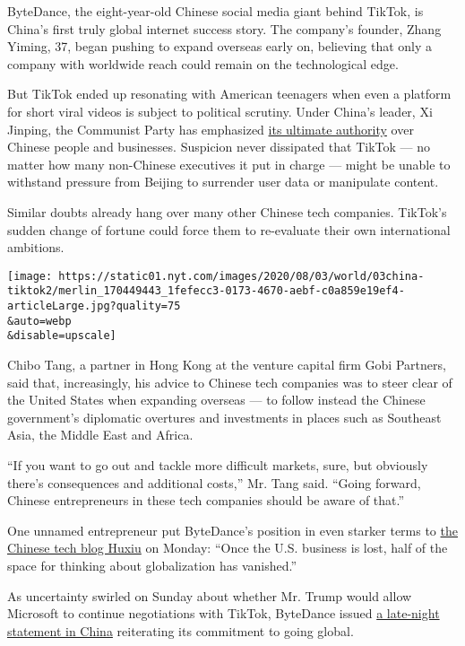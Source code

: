 ByteDance, the eight-year-old Chinese social media giant behind TikTok,
is China's first truly global internet success story. The company's
founder, Zhang Yiming, 37, began pushing to expand overseas early on,
believing that only a company with worldwide reach could remain on the
technological edge.

But TikTok ended up resonating with American teenagers when even a
platform for short viral videos is subject to political scrutiny. Under
China's leader, Xi Jinping, the Communist Party has emphasized
\href{https://www.nytimes.com/2018/12/18/world/asia/xi-jinping-speech-china.html}{its
ultimate authority} over Chinese people and businesses. Suspicion never
dissipated that TikTok --- no matter how many non-Chinese executives it
put in charge --- might be unable to withstand pressure from Beijing to
surrender user data or manipulate content.

Similar doubts already hang over many other Chinese tech companies.
TikTok's sudden change of fortune could force them to re-evaluate their
own international ambitions.

\texttt{[image: https://static01.nyt.com/images/2020/08/03/world/03china-tiktok2/merlin\_170449443\_1fefecc3-0173-4670-aebf-c0a859e19ef4-articleLarge.jpg?quality=75\\\&auto=webp\\\&disable=upscale]}

Chibo Tang, a partner in Hong Kong at the venture capital firm Gobi
Partners, said that, increasingly, his advice to Chinese tech companies
was to steer clear of the United States when expanding overseas --- to
follow instead the Chinese government's diplomatic overtures and
investments in places such as Southeast Asia, the Middle East and
Africa.

``If you want to go out and tackle more difficult markets, sure, but
obviously there's consequences and additional costs,'' Mr. Tang said.
``Going forward, Chinese entrepreneurs in these tech companies should be
aware of that.''

One unnamed entrepreneur put ByteDance's position in even starker terms
to \href{https://m.huxiu.com/article/373071.html}{the Chinese tech blog
Huxiu} on Monday: ``Once the U.S. business is lost, half of the space
for thinking about globalization has vanished.''

As uncertainty swirled on Sunday about whether Mr. Trump would allow
Microsoft to continue negotiations with TikTok, ByteDance issued
\href{https://www.toutiao.com/a1673929179426827}{a late-night statement
in China} reiterating its commitment to going global.


